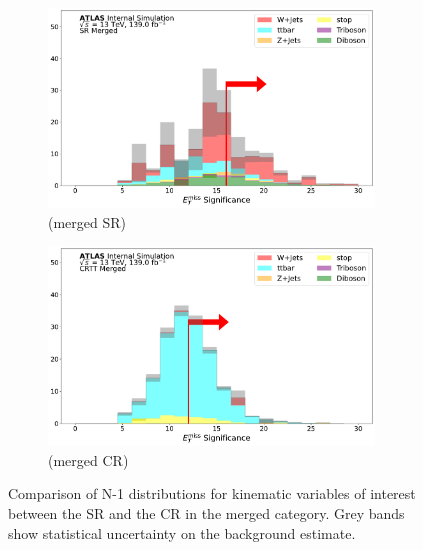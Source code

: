 \begin{figure}[htbp]
 \begin{subfigure}{0.45\textwidth}
     \includegraphics[width = 0.95\textwidth]{Figures/App_SR_CR_distributions/SR1L_Merged/MetTST_Significance_N_1.pdf}
    \caption{\metsig (merged SR)}
     \end{subfigure}
    \begin{subfigure}{0.45\textwidth}
     \includegraphics[width = 0.95\textwidth]{Figures/App_SR_CR_distributions/CRTT_Merged/MetTST_Significance_N_1.pdf}
     \caption{\metsig (merged \ttbar CR)}
     \end{subfigure}
      \caption[Comparison of N-1 distributions for kinematic variables of interest between the signal region and the ttbar control region in the merged category.]{Comparison of N-1 distributions for kinematic variables of interest between the SR and the \ttbar CR in the merged category. Grey bands show statistical uncertainty on the background estimate.}
      \label{fig:N_1_CRTT_merged}
       \end{figure}
       
       \captionsetup[figure]{list=no}
       
